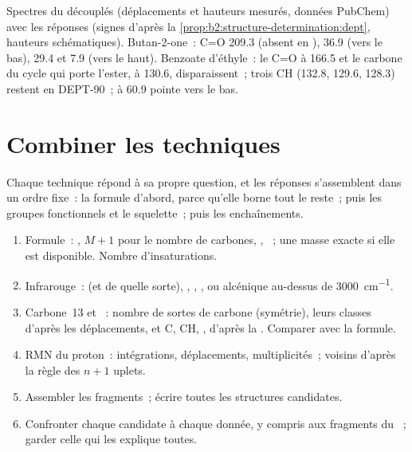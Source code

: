 \begin{omfigure}
{\small Spectres du  découplés (déplacements et hauteurs mesurés, données PubChem) avec les
réponses  (signes d'après la \cref{prop:b2:structure-determination:dept}, hauteurs schématiques).
Butan-2-one~: C=O 209.3 (absent en ),  36.9 (vers le bas),  29.4 et 7.9 (vers le
haut). Benzoate d'éthyle~: le C=O à 166.5 et le carbone du cycle qui porte l'ester, à 130.6,
disparaissent~; trois CH  (132.8, 129.6, 128.3) restent en DEPT-90~;  à 60.9 pointe
vers le bas.}
\end{omfigure}

\section{Combiner les techniques}

Chaque technique répond à sa propre question, et les réponses s'assemblent dans un ordre fixe~: la
formule d'abord, parce qu'elle borne tout le reste~; puis les groupes fonctionnels et le squelette~;
puis les enchaînements.

\begin{method}\label{met:b2:structure-determination:solve}
\begin{enumerate}
  \item Formule~: , $M+1$ pour le nombre de carbones, , ~; une masse exacte si elle est disponible. Nombre d'insaturations.
  \item Infrarouge~:  (et de quelle sorte), , , ,  
        ou alcénique au-dessus de \qty{3000}{cm^{-1}}.
  \item Carbone~13 et ~: nombre de sortes de carbone (symétrie), leurs classes d'après les
        déplacements, et C, CH, ,  d'après la . Comparer avec la formule.
  \item RMN du proton~: intégrations, déplacements, multiplicités~; voisins d'après la règle des $n + 1$ uplets.
  \item Assembler les fragments~; écrire toutes les structures candidates.
  \item Confronter chaque candidate à chaque donnée, y compris aux fragments du ~; garder
        celle qui les explique toutes.
\end{enumerate}
\end{method}

